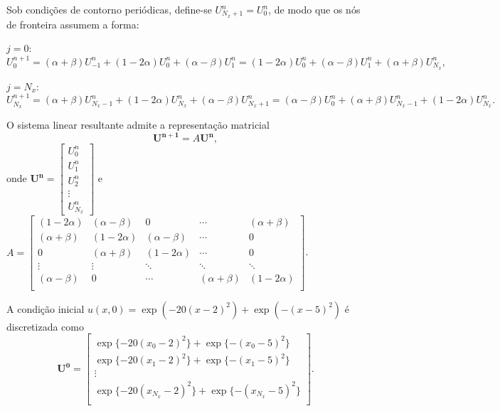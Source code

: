 \documentclass[12pt, a4paper]{article}
\renewcommand{\bf}[1]{\mathbf{#1}}
\begin{document}
    \vspace{.4cm}

    Sob condições de contorno periódicas, define-se $U_{N_x+1}^n = U_0^n$, de modo que os nós de fronteira assumem a forma:

    $j = 0$:
    \[U_0^{n+1} = (\alpha+\beta)U_{-1}^n + (1-2\alpha)U_0^n + (\alpha-\beta)U_{1}^n = (1-2\alpha)U_0^n + (\alpha-\beta)U_{1}^n + (\alpha+\beta)U_{N_x}^n,\]

    $j = N_x$:
    \[U_{N_x}^{n+1} = (\alpha+\beta)U_{N_x-1}^n + (1-2\alpha)U_{N_x}^n + (\alpha-\beta)U_{N_x+1}^n = (\alpha-\beta)U_{0}^n + (\alpha+\beta)U_{N_x-1}^n + (1-2\alpha)U_{N_x}^n.\]

    O sistema linear resultante admite a representação matricial
    \begin{equation}
        \bf{U^{n+1}} = A\bf{U^n},
    \end{equation}
    onde $\bf{U^n} = \begin{bmatrix}
        U_0^n \\ U_1^n \\ U_2^n \\ \vdots \\ U_{N_x}^n
    \end{bmatrix}$ e $A = \begin{bmatrix}
        (1-2\alpha) & (\alpha-\beta) & 0 & \cdots & (\alpha+\beta)\\
        (\alpha+\beta) & (1-2\alpha) & (\alpha-\beta) & \cdots & 0\\
        0 & (\alpha+\beta) & (1-2\alpha) & \cdots & 0\\
        \vdots & \vdots & \ddots & \ddots & \ddots\\
        (\alpha-\beta) & 0 & \cdots & (\alpha+\beta) & (1-2\alpha)\\
    \end{bmatrix}$.

    \vspace{.4cm}

    A condição inicial $u(x,0) = \exp(-20{(x-2)}^2)+\exp(-{(x-5)}^2)$ é discretizada como
    \[\bf{U^0} = \begin{bmatrix}
        \exp\{-20{(x_0-2)}^2\}+\exp\{-{(x_0-5)}^2\}\\
        \exp\{-20{(x_1-2)}^2\}+\exp\{-{(x_1-5)}^2\}\\
        \vdots\\
        \exp\{-20{(x_{N_x}-2)}^2\}+\exp\{-{(x_{N_x}-5)}^2\}\\
    \end{bmatrix}.\]
\end{document}
